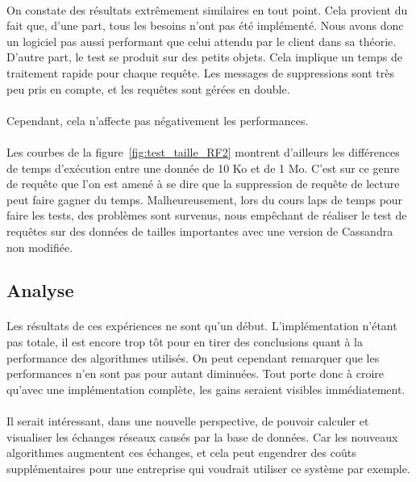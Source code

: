 \documentclass[12pt]{article}
\begin{document}
\paragraph{}On constate des résultats extrêmement similaires en tout point. Cela provient du fait que, d'une part, tous les besoins n'ont pas été implémenté. Nous avons donc un logiciel pas aussi performant que celui attendu par le client dans sa théorie. D'autre part, le test se produit sur des petits objets. Cela implique un temps de traitement rapide pour chaque requête. Les messages de suppressions sont très peu pris en compte, et les requêtes sont gérées en double.

\paragraph{}Cependant, cela n'affecte pas négativement les performances.

\paragraph{}Les courbes de la figure~\ref{fig:test_taille_RF2} montrent d'ailleurs les différences de temps d'exécution entre une donnée de 10 Ko et de 1 Mo. C'est sur ce genre de requête que l'on est amené à se dire que la suppression de requête de lecture peut faire gagner du temps. Malheureusement, lors du cours laps de temps pour faire les tests, des problèmes sont survenus, nous empêchant de réaliser le test de requêtes sur des données de tailles importantes avec une version de Cassandra non modifiée.

\subsection{Analyse}

\paragraph{}Les résultats de ces expériences ne sont qu'un début. L'implémentation n'étant pas totale, il est encore trop tôt pour en tirer des conclusions quant à la performance des algorithmes utilisés. On peut cependant remarquer que les performances n'en sont pas pour autant diminuées. Tout porte donc à croire qu'avec une implémentation complète, les gains seraient visibles immédiatement.

\paragraph{}Il serait intéressant, dans une nouvelle perspective, de pouvoir calculer et visualiser les échanges réseaux causés par la base de données. Car les nouveaux algorithmes augmentent ces échanges, et cela peut engendrer des coûts supplémentaires pour une entreprise qui voudrait utiliser ce système par exemple.
\end{document}
